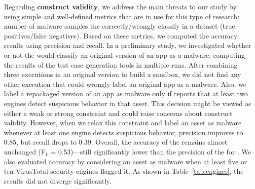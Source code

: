 Regarding {\bf construct validity}, we address the main threats to our study by using simple and
well-defined metrics that are in use for this type of research: number of malware samples the
\mas correctly/wrongly classify in a dataset (true positives/false negatives).
Based on these metrics, we computed the accuracy results using precision and recall. In a preliminary study, we
investigated whether or not the \mas would classify an original version of an app as a malware,
computing the results of the test case generation tools in multiple runs. After combining three executions
in an original version to build a sandbox, we did not find any other execution that could wrongly
label an original app as a malware. Also, we label a repackaged version of an app as malware
  only if \vt reports that at least two engines detect suspicious behavior in that asset.
  This decision might be viewed as either a weak or strong constraint and could
  raise concerns about construct validity. However, when we relax this constraint and label an asset as malware whenever at least one engine detects suspicious behavior, precision improves to 0.85,
  but recall drops to 0.39. Overall, the accuracy of the \mas remains almost unchanged (F$_1$ = 0.53)---still significantly lower than the precision of the \mas for \sds.
  We also evaluated accuracy by considering an asset as malware when at least five or ten VirusTotal security engines flagged it. As shown in Table~\ref{tab:engines},
  the results did not diverge significantly.


